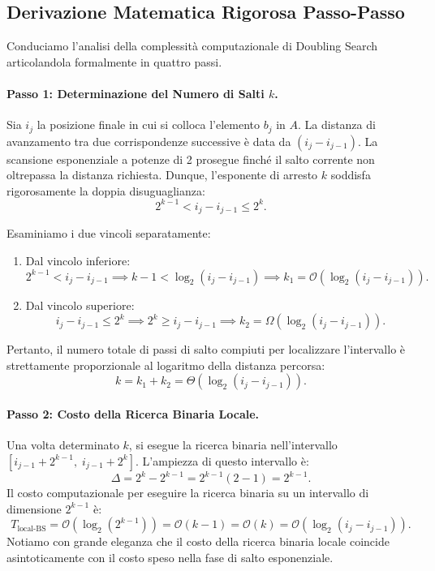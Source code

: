 \subsection{Derivazione Matematica Rigorosa Passo-Passo}
Conduciamo l'analisi della complessità computazionale di Doubling Search articolandola formalmente in quattro passi.

\paragraph{Passo 1: Determinazione del Numero di Salti $k$.}
Sia $i_j$ la posizione finale in cui si colloca l'elemento $b_j$ in $A$. La distanza di avanzamento tra due corrispondenze successive è data da $(i_j - i_{j-1})$.
La scansione esponenziale a potenze di 2 prosegue finché il salto corrente non oltrepassa la distanza richiesta. Dunque, l'esponente di arresto $k$ soddisfa rigorosamente la doppia disuguaglianza:
\begin{equation}
  2^{k-1} < i_j - i_{j-1} \le 2^k.
  \label{eq:doubling-bracket}
\end{equation}

Esaminiamo i due vincoli separatamente:
\begin{enumerate}
  \item Dal vincolo inferiore:
  \begin{equation}
    2^{k-1} < i_j - i_{j-1} \implies k - 1 < \log_2(i_j - i_{j-1}) \implies k_1 = \mathcal{O}(\log_2(i_j - i_{j-1})).
  \end{equation}
  \item Dal vincolo superiore:
  \begin{equation}
    i_j - i_{j-1} \le 2^k \implies 2^k \ge i_j - i_{j-1} \implies k_2 = \Omega(\log_2(i_j - i_{j-1})).
  \end{equation}
\end{enumerate}
Pertanto, il numero totale di passi di salto compiuti per localizzare l'intervallo è strettamente proporzionale al logaritmo della distanza percorsa:
\begin{equation}
  k = k_1 + k_2 = \Theta(\log_2(i_j - i_{j-1})).
\end{equation}

\paragraph{Passo 2: Costo della Ricerca Binaria Locale.}
Una volta determinato $k$, si esegue la ricerca binaria nell'intervallo $[i_{j-1} + 2^{k-1}, \; i_{j-1} + 2^k]$. L'ampiezza di questo intervallo è:
\begin{equation}
  \Delta = 2^k - 2^{k-1} = 2^{k-1} (2 - 1) = 2^{k-1}.
\end{equation}
Il costo computazionale per eseguire la ricerca binaria su un intervallo di dimensione $2^{k-1}$ è:
\begin{equation}
  T_{\text{local-BS}} = \mathcal{O}(\log_2(2^{k-1})) = \mathcal{O}(k - 1) = \mathcal{O}(k) = \mathcal{O}(\log_2(i_j - i_{j-1})).
\end{equation}
Notiamo con grande eleganza che il costo della ricerca binaria locale coincide asintoticamente con il costo speso nella fase di salto esponenziale.

